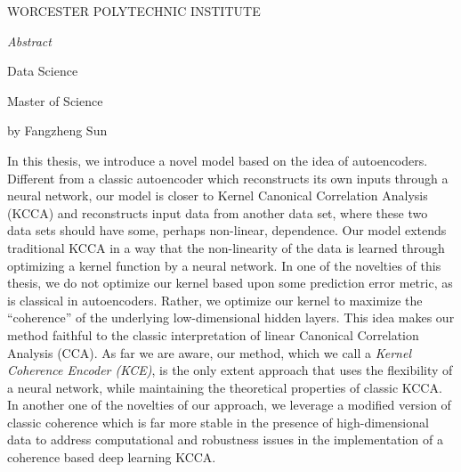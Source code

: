\documentclass[12pt]{report} %
\begin{document}
\begin{center}
	WORCESTER POLYTECHNIC INSTITUTE\\
	\vspace{1 in}
	\begin{Large}
		\emph{Abstract}\\
	\end{Large}
	\vspace{30 bp}
	\begin{small}
		Data Science\\
	\end{small}
	\vspace{15 bp}
	\begin{small}
		Master of Science\\
	\end{small}
	\vspace{15 bp}
	\begin{small}
		by Fangzheng Sun\\
	\end{small}
\end{center}
In this thesis, we introduce a novel model based on the idea of autoencoders. Different from a classic autoencoder which reconstructs its own inputs through a neural network, our model is closer to Kernel Canonical Correlation Analysis (KCCA) and reconstructs input data from another data set, where these two data sets should have some, perhaps non-linear, dependence. Our model extends traditional KCCA in a way that the non-linearity of the data is learned through optimizing a kernel function by a neural network. In one of the novelties of this thesis, we do not optimize our kernel based upon some prediction error metric, as is classical in autoencoders. Rather, we optimize our kernel to maximize the ``coherence'' of the underlying low-dimensional hidden layers. This idea makes our method faithful to the classic interpretation of linear Canonical Correlation Analysis (CCA). As far we are aware, our method, which we call a \textit{Kernel Coherence Encoder (KCE)}, is the only extent approach that uses the flexibility of a neural network, while maintaining the theoretical properties of classic KCCA. In another one of the novelties of our approach, we leverage a modified version of classic coherence which is far more stable in the presence of high-dimensional data to address computational and robustness issues in the implementation of a coherence based deep learning KCCA.

\clearpage
\end{document}
